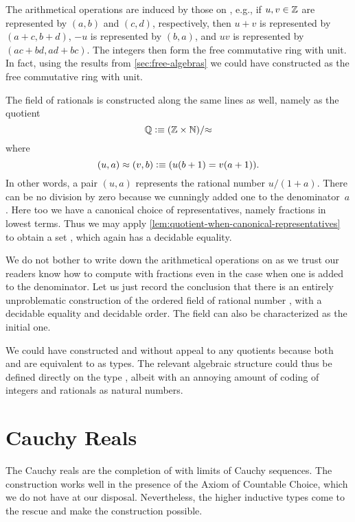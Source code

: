 The arithmetical operations are induced by those on \N, e.g., if $u, v \in \mathbb{Z}$ are
represented by $(a,b)$ and $(c,d)$, respectively, then $u + v$ is represented by $(a + c,
b + d)$, $-u$ is represented by $(b, a)$, and $u v$ is represented by $(a c + b d, a d + b
c)$. The integers \Z then form the free commutative ring with unit. In fact, using the
results from \autoref{sec:free-algebras} we could have constructed \Z as the free
commutative ring with unit.

The field of rationals \Q is constructed along the same lines as well, namely as the
quotient
%
\[ \mathbb{Q} \vcentcolon\equiv (\mathbb{Z} \times \mathbb{N})/{\approx} \]
%
where
\[ (u,a) \approx (v,b) \vcentcolon\equiv (u (b + 1) = v (a + 1)). \]
%
In other words, a pair $(u, a)$ represents the rational number $u / (1 + a)$. There can be
no division by zero because we cunningly added one to the denominator~$a$. Here too we
have a canonical choice of representatives, namely fractions in lowest terms. Thus we may
apply \autoref{lem:quotient-when-canonical-representatives} to obtain a set \Q, which
again has a decidable equality.

We do not bother to write down the arithmetical operations on \Q as we trust our readers
know how to compute with fractions even in the case when one is added to the denominator.
Let us just record the conclusion that there is an entirely unproblematic construction of
the ordered field of rational number \Q, with a decidable equality and decidable order.
The field \Q can also be characterized as the initial one.

\begin{rmk}
  We could have constructed \Z and \Q without appeal to any quotients because both \Z and
  \Q are equivalent to \N as types. The relevant algebraic structure could thus be defined
  directly on the type \N, albeit with an annoying amount of coding of integers and
  rationals as natural numbers.
\end{rmk}

\section{Cauchy Reals}
\label{sec:cauchy-reals}

The Cauchy reals are the completion of \Q with limits of Cauchy sequences. The
construction works well in the presence of the Axiom of Countable Choice, which we do not
have at our disposal. Nevertheless, the higher inductive types come to the rescue and make
the construction possible.

